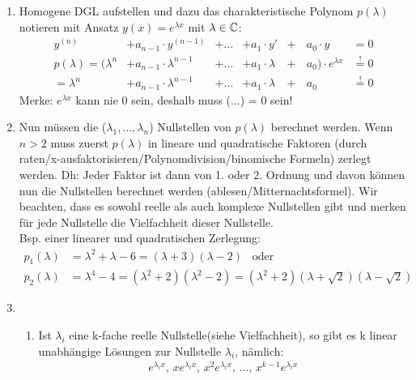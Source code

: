 \begin{enumerate}[leftmargin=0.5cm]
	\item Homogene DGL aufstellen und dazu das charakteristische Polynom $p(\lambda)$ notieren mit Ansatz $y(x) = e^{\lambda x}$ mit $\lambda \in \mathbb{C}$:
	\begin{align*}
		y^{(n)} &+ a_{n-1} \cdot y^{(n-1)} &+ \ldots &+ a_1 \cdot y' &+& \, a_0 \cdot y&=0\\
		p(\lambda) = (\lambda^n &+ a_{n-1} \cdot \lambda^{n-1} &+ \ldots &+ a_1 \cdot \lambda &+& \, a_0) \cdot e^{\lambda x} &\overset{!}{=} 0 \\
		= \lambda^n &+ a_{n-1} \cdot \lambda^{n-1} &+ \ldots &+ a_1 \cdot \lambda &+& \, a_0 &\overset{!}{=} 0
	\end{align*}
	Merke: $e^{\lambda x}$ kann nie 0 sein, deshalb muss (...) = 0 sein!

	\item Nun müssen die ($\lambda_1, \ldots, \lambda_n$) Nullstellen von $p(\lambda)$ berechnet werden. Wenn $n > 2$ muss zuerst $p(\lambda)$ in lineare und quadratische Faktoren (durch raten/x-ausfaktorisieren/Polynomdivision/binomische Formeln) zerlegt werden. Dh: Jeder Faktor ist dann von 1. oder 2. Ordnung und davon können nun die Nullstellen berechnet werden (ablesen/Mitternachtsformel). Wir beachten, dass es sowohl reelle als auch komplexe Nullstellen gibt und merken für jede Nullstelle die Vielfachheit dieser Nullstelle.\\
	Bsp. einer linearer und quadratischen Zerlegung:
	{\small\vspace{-0.2cm} \begin{align*}
			p_1(\lambda) &= \lambda^2 + \lambda - 6 = (\lambda + 3) (\lambda - 2) \hspace{10pt} \text{oder} \\
			p_2(\lambda) &= \lambda^4 -4 = (\lambda^2 + 2) (\lambda^2 - 2) = (\lambda^2 + 2) (\lambda + \sqrt{2}) (\lambda - \sqrt{2})
	\end{align*}}
	\item 
	\begin{enumerate}[leftmargin=0.3cm]
		\item Ist $\lambda_i$ eine k-fache reelle Nullstelle(siehe Vielfachheit), so gibt es k linear unabhängige Lösungen zur Nullstelle $\lambda_i$, nämlich:
		\vspace{3pt}
		\begin{align*}
			e^{\lambda_i x}, \, x e^{\lambda_i x}, \, x^2 e^{\lambda_i x}, \, ... , \, x^{k-1} e^{\lambda_i x}
		\end{align*}


\end{enumerate}
\end{enumerate}
